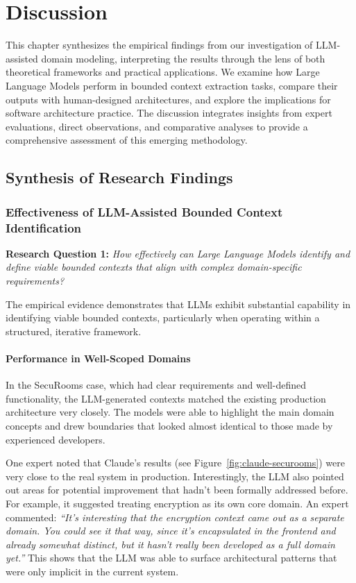 \chapter{Discussion}

This chapter synthesizes the empirical findings from our investigation of LLM-assisted domain modeling, interpreting the results through the lens of both theoretical frameworks and practical applications. We examine how Large Language Models perform in bounded context extraction tasks, compare their outputs with human-designed architectures, and explore the implications for software architecture practice. The discussion integrates insights from expert evaluations, direct observations, and comparative analyses to provide a comprehensive assessment of this emerging methodology.

\section{Synthesis of Research Findings}

\subsection{Effectiveness of LLM-Assisted Bounded Context Identification}

\textbf{Research Question 1:} \textit{How effectively can Large Language Models identify and define viable bounded contexts that align with complex domain-specific requirements?}

The empirical evidence demonstrates that LLMs exhibit substantial capability in identifying viable bounded contexts, particularly when operating within a structured, iterative framework.

\subsubsection{Performance in Well-Scoped Domains}
In the SecuRooms case, which had clear requirements and well-defined functionality, the LLM-generated contexts matched the existing production architecture very closely. The models were able to highlight the main domain concepts and drew boundaries that looked almost identical to those made by experienced developers.

One expert noted that Claude's results (see Figure~\ref{fig:claude-securooms}) were very close to the real system in production. Interestingly, the LLM also pointed out areas for potential improvement that hadn't been formally addressed before. For example, it suggested treating encryption as its own core domain. An expert commented: \textit{“It's interesting that the encryption context came out as a separate domain. You could see it that way, since it's encapsulated in the frontend and already somewhat distinct, but it hasn't really been developed as a full domain yet.”} This shows that the LLM was able to surface architectural patterns that were only implicit in the current system.

